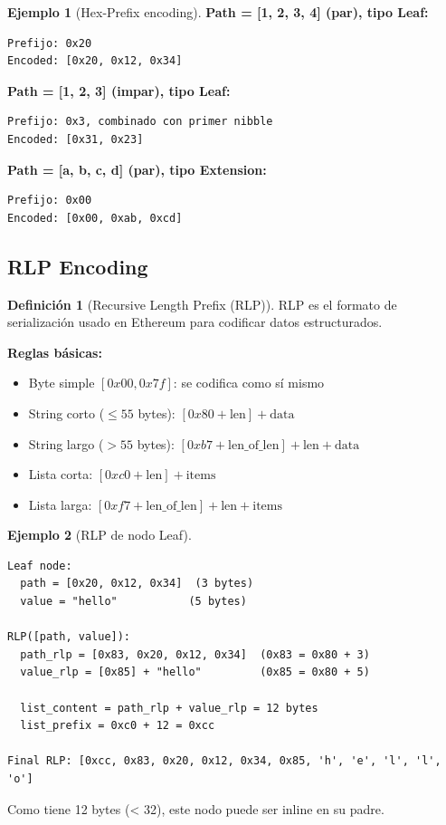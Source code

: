 \documentclass[11pt,a4paper,twoside,openright]{book}
\theoremstyle{definition}
\newtheorem{definition}{Definición}[chapter]
\newtheorem{example}{Ejemplo}[chapter]
\theoremstyle{plain}
\theoremstyle{remark}
\begin{document}
\begin{example}[Hex-Prefix encoding]
\textbf{Path = [1, 2, 3, 4] (par), tipo Leaf:}
\begin{verbatim}
Prefijo: 0x20
Encoded: [0x20, 0x12, 0x34]
\end{verbatim}

\textbf{Path = [1, 2, 3] (impar), tipo Leaf:}
\begin{verbatim}
Prefijo: 0x3, combinado con primer nibble
Encoded: [0x31, 0x23]
\end{verbatim}

\textbf{Path = [a, b, c, d] (par), tipo Extension:}
\begin{verbatim}
Prefijo: 0x00
Encoded: [0x00, 0xab, 0xcd]
\end{verbatim}
\end{example}

\subsection{RLP Encoding}

\begin{definition}[Recursive Length Prefix (RLP)]
RLP es el formato de serialización usado en Ethereum para codificar datos estructurados.

\textbf{Reglas básicas:}
\begin{itemize}
    \item Byte simple $[0x00, 0x7f]$: se codifica como sí mismo
    \item String corto ($\leq 55$ bytes): $[0x80 + \text{len}] + \text{data}$
    \item String largo ($> 55$ bytes): $[0xb7 + \text{len\_of\_len}] + \text{len} + \text{data}$
    \item Lista corta: $[0xc0 + \text{len}] + \text{items}$
    \item Lista larga: $[0xf7 + \text{len\_of\_len}] + \text{len} + \text{items}$
\end{itemize}
\end{definition}

\begin{example}[RLP de nodo Leaf]
\begin{verbatim}
Leaf node:
  path = [0x20, 0x12, 0x34]  (3 bytes)
  value = "hello"           (5 bytes)

RLP([path, value]):
  path_rlp = [0x83, 0x20, 0x12, 0x34]  (0x83 = 0x80 + 3)
  value_rlp = [0x85] + "hello"         (0x85 = 0x80 + 5)
  
  list_content = path_rlp + value_rlp = 12 bytes
  list_prefix = 0xc0 + 12 = 0xcc
  
Final RLP: [0xcc, 0x83, 0x20, 0x12, 0x34, 0x85, 'h', 'e', 'l', 'l', 'o']
\end{verbatim}

Como tiene 12 bytes (< 32), este nodo puede ser inline en su padre.
\end{example}
\end{document}
